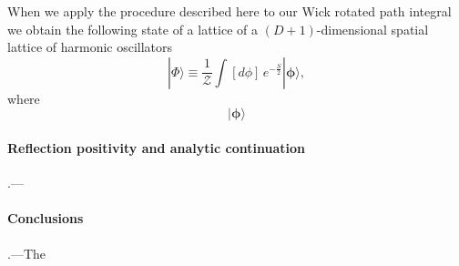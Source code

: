 \documentclass[prl,twocolumn,lengthcheck,superscriptaddress]{revtex4-1}
\theoremstyle{definition}
\theoremstyle{remark}
\begin{document}
When we apply the procedure described here to our Wick rotated path integral we obtain the following state of a lattice of a $(D+1)$-dimensional spatial lattice of harmonic oscillators 
\begin{equation}
	|\Phi\rangle \equiv \frac{1}{\mathcal{Z}}\int [d\phi] \,e^{-\frac{S}{2}}  |\boldsymbol{\phi}\rangle,
\end{equation}
where
\begin{equation}
	|\boldsymbol{\phi}\rangle 
\end{equation}

\paragraph{Reflection positivity and analytic continuation}\hspace{-1em}.---

\paragraph{Conclusions}\hspace{-1em}.---The


\end{document}
